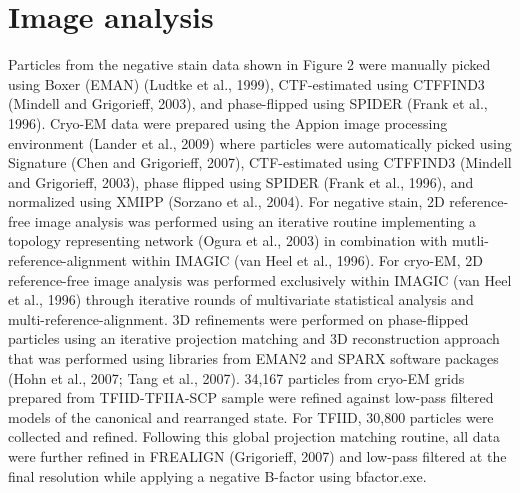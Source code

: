\section{Image analysis}

Particles from the negative stain data shown in Figure 2 were manually picked using Boxer (EMAN) (Ludtke et al., 1999), CTF-estimated using CTFFIND3 (Mindell and Grigorieff, 2003), and phase-flipped using SPIDER (Frank et al., 1996). Cryo-EM data were prepared using the Appion image processing environment (Lander et al., 2009) where particles were automatically picked using Signature (Chen and Grigorieff, 2007), CTF-estimated using CTFFIND3 (Mindell and Grigorieff, 2003), phase flipped using SPIDER (Frank et al., 1996), and normalized using XMIPP (Sorzano et al., 2004). 
	For negative stain, 2D reference-free image analysis was performed using an iterative routine implementing a topology representing network (Ogura et al., 2003) in combination with mutli-reference-alignment within IMAGIC (van Heel et al., 1996). For cryo-EM, 2D reference-free image analysis was performed exclusively within IMAGIC (van Heel et al., 1996) through iterative rounds of multivariate statistical analysis and multi-reference-alignment. 
	3D refinements were performed on phase-flipped particles using an iterative projection matching and 3D reconstruction approach that was performed using libraries from EMAN2 and SPARX software packages (Hohn et al., 2007; Tang et al., 2007). 34,167 particles from cryo-EM grids prepared from TFIID-TFIIA-SCP sample were refined against low-pass filtered models of the canonical and rearranged state. For TFIID, 30,800 particles were collected and refined. Following this global projection matching routine, all data were further refined in FREALIGN (Grigorieff, 2007) and low-pass filtered at the final resolution while applying a negative B-factor using bfactor.exe. 


